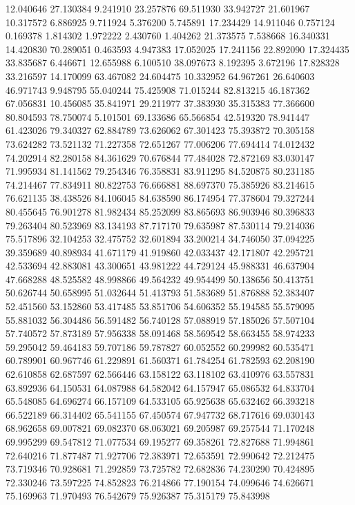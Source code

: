 12.040646
27.130384
9.241910
23.257876
69.511930
33.942727
21.601967
10.317572
6.886925
9.711924
5.376200
5.745891
17.234429
14.911046
0.757124
0.169378
1.814302
1.972222
2.430760
1.404262
21.373575
7.538668
16.340331
14.420830
70.289051
0.463593
4.947383
17.052025
17.241156
22.892090
17.324435
33.835687
6.446671
12.655988
6.100510
38.097673
8.192395
3.672196
17.828328
33.216597
14.170099
63.467082
24.604475
10.332952
64.967261
26.640603
46.971743
9.948795
55.040244
75.425908
71.015244
82.813215
46.187362
67.056831
10.456085
35.841971
29.211977
37.383930
35.315383
77.366600
80.804593
78.750074
5.101501
69.133686
65.566854
42.519320
78.941447
61.423026
79.340327
62.884789
73.626062
67.301423
75.393872
70.305158
73.624282
73.521132
71.227358
72.651267
77.006206
77.694414
74.012432
74.202914
82.280158
84.361629
70.676844
77.484028
72.872169
83.030147
71.995934
81.141562
79.254346
76.358831
83.911295
84.520875
80.231185
74.214467
77.834911
80.822753
76.666881
88.697370
75.385926
83.214615
76.621135
38.438526
84.106045
84.638590
86.174954
77.378604
79.327244
80.455645
76.901278
81.982434
85.252099
83.865693
86.903946
80.396833
79.263404
80.523969
83.134193
87.717170
79.635987
87.530114
79.214036
75.517896
32.104253
32.475752
32.601894
33.200214
34.746050
37.094225
39.359689
40.898934
41.671179
41.919860
42.033437
42.171807
42.295721
42.533694
42.883081
43.300651
43.981222
44.729124
45.988331
46.637904
47.668288
48.525582
48.998866
49.564232
49.954499
50.138656
50.413751
50.626744
50.658995
51.032644
51.413793
51.583689
51.876888
52.383407
52.451560
53.152860
53.417485
53.851706
54.606352
55.194585
55.579095
55.881032
56.304486
56.591482
56.740128
57.088919
57.185026
57.507104
57.740572
57.873189
57.956338
58.091468
58.569542
58.663455
58.974233
59.295042
59.464183
59.707186
59.787827
60.052552
60.299982
60.535471
60.789901
60.967746
61.229891
61.560371
61.784254
61.782593
62.208190
62.610858
62.687597
62.566446
63.158122
63.118102
63.410976
63.557831
63.892936
64.150531
64.087988
64.582042
64.157947
65.086532
64.833704
65.548085
64.696274
66.157109
64.533105
65.925638
65.632462
66.393218
66.522189
66.314402
65.541155
67.450574
67.947732
68.717616
69.030143
68.962658
69.007821
69.082370
68.063021
69.205987
69.257544
71.170248
69.995299
69.547812
71.077534
69.195277
69.358261
72.827688
71.994861
72.640216
71.877487
71.927706
72.383971
72.653591
72.990642
72.212475
73.719346
70.928681
71.292859
73.725782
72.682836
74.230290
70.424895
72.330246
73.597225
74.852823
76.214866
77.190154
74.099646
74.626671
75.169963
71.970493
76.542679
75.926387
75.315179
75.843998
